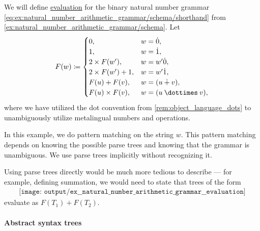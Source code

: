 \begin{example}\label{ex:natural_number_arithmetic_grammar/evaluation}
  We will define \hyperref[con:evaluation]{evaluation} for the binary natural number grammar \eqref{eq:ex:natural_number_arithmetic_grammar/schema/shorthand} from \cref{ex:natural_number_arithmetic_grammar/schema}. Let
  \begin{equation*}
    F(w) \coloneqq \begin{cases}
      0,                  &w = \syn0, \\
      1,                  &w = \syn1, \\
      2 \times F(w'),     &w = w' \syn0, \\
      2 \times F(w') + 1, &w = w' \syn1, \\
      F(u) + F(v),        &w = (u \synplus v), \\
      F(u) \times F(v),   &w = (u \syntimes v),
    \end{cases}
  \end{equation*}
  where we have utilized the dot convention from \cref{rem:object_language_dots} to unambiguously utilize metalingual numbers and operations.

  In this example, we do pattern matching on the string \( w \). This pattern matching depends on knowing the possible parse trees and knowing that the grammar is unambiguous. We use parse trees implicitly without recognizing it.

  Using parse trees directly would be much more tedious to describe --- for example, defining summation, we would need to state that trees of the form
  \begin{equation*}
    \begin{aligned}
      \texttt{[image: output/ex\_\_natural\_number\_arithmetic\_grammar\_\_evaluation]}
    \end{aligned}
  \end{equation*}
  evaluate as \( F(T_1) + F(T_2) \).
\end{example}

\paragraph{Abstract syntax trees}

